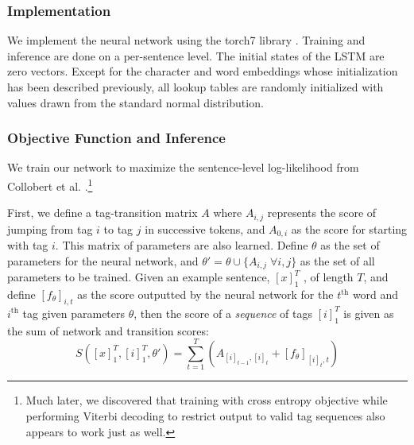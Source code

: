 \documentclass[11pt,letterpaper]{article}
\begin{document}
\subsubsection{Implementation}

We implement the neural network using the torch7 library \cite{collobert2011torch7}. Training and inference are done on a per-sentence level. The initial states of the LSTM are zero vectors. Except for the character and word embeddings whose initialization has  been described previously, all lookup tables are randomly initialized with values drawn from the standard normal distribution. %

\subsubsection{Objective Function and Inference}

We train our network to maximize the sentence-level log-likelihood from Collobert et al. .\footnote{Much later, we discovered that training with cross entropy objective while performing Viterbi decoding to restrict output to valid tag sequences also appears to work just as well.}

First, we define a tag-transition matrix $A$ where $A_{i,j}$ represents the score of jumping from tag $i$ to tag $j$ in successive tokens, and $A_{0,i}$ as the score for starting with tag $i$. This matrix of parameters are also learned. Define $\theta$ as the set of parameters for the neural network, and $\theta' = \theta \cup \{A_{i,j} \; \forall i, j\}$ as the set of all parameters to be trained. Given an example sentence, $[x]_1^T$ , of length $T$, and define $[f_{\theta}]_{i,t}$ as the score outputted by the neural network for the $t^{\text{th}}$ word and $i^{\text{th}}$ tag given parameters $\theta$, then the score of a \emph{sequence} of tags $[i]_1^T$ is given as the sum of network and transition scores:
$$S([x]_1^T, [i]_1^T, \theta') = \sum_{t=1}^T \left ( A_{[i]_{t-1}, [i]_t} + [f_{\theta}]_{[i]_t, t} \right )$$

\end{document}
